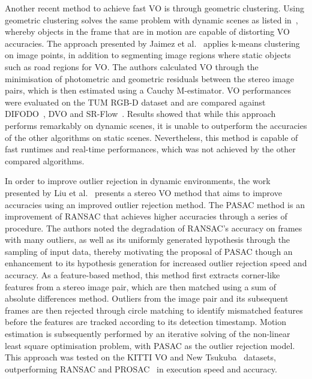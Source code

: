 Another recent method to achieve fast VO is through geometric clustering. Using geometric clustering solves the same problem with dynamic scenes as listed in~\cite{an_semantic_2017}, whereby objects in the frame that are in motion are capable of distorting VO accuracies. The approach presented by Jaimez et al.~\cite{jaimez_fast_2017} applies k-means clustering on image points, in addition to segmenting image regions where static objects such as road regions for VO. The authors calculated VO through the minimisation of photometric and geometric residuals between the stereo image pairs, which is then estimated using a Cauchy M-estimator. VO performances were evaluated on the TUM RGB-D dataset and are compared against DIFODO~\cite{jaimez_fast_2015}, DVO and SR-Flow~\cite{quiroga_dense_2014}. Results showed that while this approach performs remarkably on dynamic scenes, it is unable to outperform the accuracies of the other algorithms on static scenes. Nevertheless, this method is capable of fast runtimes and real-time performances, which was not achieved by the other compared algorithms. 

In order to improve outlier rejection in dynamic environments, the work presented by Liu et al.~\cite{liu_robust_2017} presents a stereo VO method that aims to improve accuracies using an improved outlier rejection method. The PASAC method is an improvement of RANSAC that achieves higher accuracies through a series of procedure. The authors noted the degradation of RANSAC's accuracy on frames with many outliers, as well as its uniformly generated hypothesis through the sampling of input data, thereby motivating the proposal of PASAC though an enhancement to its hypothesis generation for increased outlier rejection speed and accuracy. As a feature-based method, this method first extracts corner-like features from a stereo image pair, which are then matched using a sum of absolute differences method. Outliers from the image pair and its subsequent frames are then rejected through circle matching to identify mismatched features before the features are tracked according to its detection timestamp. Motion estimation is subsequently performed by an iterative solving of the non-linear least square optimisation problem, with PASAC as the outlier rejection model. This approach was tested on the KITTI VO and New Tsukuba~\cite{martull_realistic_2012} datasets, outperforming RANSAC and PROSAC~\cite{chum_matching_2005} in execution speed and accuracy. 

